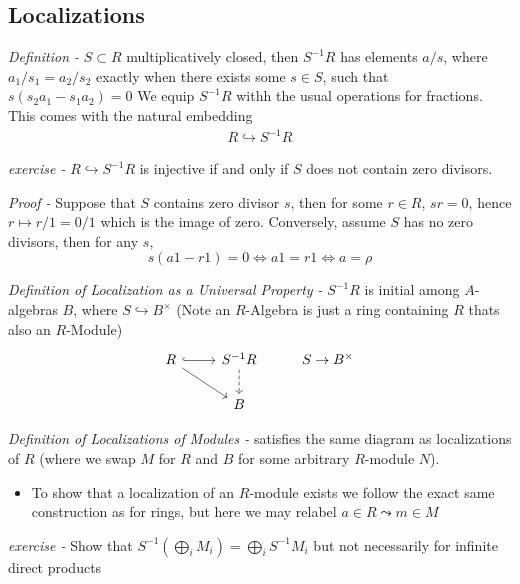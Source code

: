 \documentclass[11pt]{article}
\theoremstyle{definition}
\begin{document}
    \subsection{Localizations}

    \emph{Definition - } \(S \subset R\) multiplicatively closed, then \(S^{-1}R\) has elements \(a/s\), where \(a_1/s_1 = a_2/s_2\) exactly when there exists some \(s \in S\), such that \(s(s_2a_1 - s_1a_2) = 0\)
    We equip \(S^{-1}R\) withh the usual operations for fractions. This comes with the natural embedding
    \begin{align*}
        R \hookrightarrow S^{-1}R
    \end{align*}

    \emph{exercise - } \(R \hookrightarrow S^{-1}R\) is injective if and only if \(S\) does not contain zero divisors.

    \emph{Proof - } Suppose that \(S\) contains zero divisor \(s\), then for some \(r \in R\), \(sr = 0\), hence \(r \mapsto r/1 = 0/1\) which is the image of zero. Conversely, assume \(S\) has no zero divisors, then for any \(s\),
    \[s(a1 - r1) = 0 \iff a1 = r1 \iff a = \rho\]

    \emph{Definition of Localization as a Universal Property -} \(S^{-1}R\) is initial among \(A\)-algebras \(B\), where \(S \hookrightarrow B^\times\) (Note an \(R\)-Algebra is just a ring containing \(R\) thats also an \(R\)-Module)
    \begin{equation*}
        \begin{tikzcd}
            R \arrow[r, hook] \arrow[dr]
            & S^{-1}R \arrow[d, dashed]
            & S \to B^\times\\
            & B
        \end{tikzcd}
    \end{equation*}

    \emph{Definition of Localizations of Modules - } satisfies the same diagram as localizations of \(R\) (where we swap \(M\) for \(R\) and \(B\) for some arbitrary \(R\)-module \(N\)).
    
    \begin{itemize}
        \item To show that a localization of an \(R\)-module exists we follow the exact same construction as for rings, but here we may relabel \(a \in R \leadsto m \in M\)
    \end{itemize}

    \emph{exercise - } Show that \(S^{-1}\left(\bigoplus_i M_i\right) = \bigoplus_i S^{-1}M_i\) but not necessarily for infinite direct products
\end{document}
